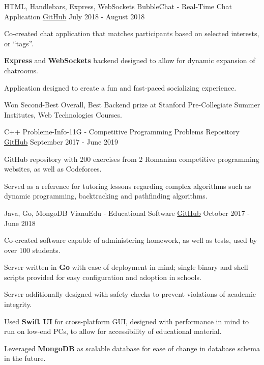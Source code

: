 
\begin{cventries}
  \cventry
    {HTML, Handlebars, Express, WebSockets}
    {BubbleChat - Real-Time Chat Application}
    {\href{https://github.com/StormFireFox1/BubbleChat}{GitHub}}
    {July 2018 - August 2018}
    {
      \begin{cvitems}
        \item {Co-created chat application that matches participants based on selected interests, or ``tags''.}
        \item {\textbf{Express} and \textbf{WebSockets} backend designed to allow for dynamic expansion of chatrooms.}
        \item {Application designed to create a fun and fast-paced socializing experience.}
        \item {Won Second-Best Overall, Best Backend prize at Stanford Pre-Collegiate Summer Institutes, Web Technologies Courses.}
      \end{cvitems}
    }
  \cventry
    {C++}
    {Probleme-Info-11G - Competitive Programming Problems Repository}
    {\href{https://github.com/StormFireFox1/Probleme-Info-11G}{GitHub}}
    {September 2017 - June 2019}
    {
      \begin{cvitems}
        \item {GitHub repository with 200 exercises from 2 Romanian competitive programming websites, as well as Codeforces.}
        \item {Served as a reference for tutoring lessons regarding complex algorithms such as dynamic programming, backtracking and pathfinding algorithms.}
      \end{cvitems}
    }
  \cventry
    {Java, Go, MongoDB}
    {VianuEdu - Educational Software}
    {\href{https://github.com/CNITV/VianuEdu}{GitHub}}
    {October 2017 - June 2018}
    {
      \begin{cvitems}
        \item {Co-created software capable of administering homework, as well as tests, used by over 100 students.}
        \item {Server written in \textbf{Go} with ease of deployment in mind; single binary and shell scripts provided for easy configuration and adoption in schools.}
        \item {Server additionally designed with safety checks to prevent violations of academic integrity.}
        \item {Used \textbf{Swift UI} for cross-platform GUI, designed with performance in mind to run on low-end PCs, to allow for accessibility of educational material.}
        \item {Leveraged \textbf{MongoDB} as scalable database for ease of change in database schema in the future.}
      \end{cvitems}
    }
\end{cventries}
